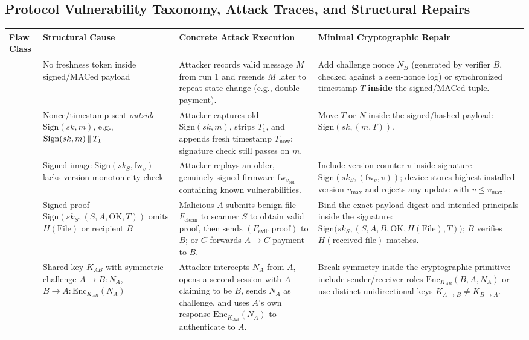 \subsection{Protocol Vulnerability Taxonomy, Attack Traces, and Structural Repairs}

\begin{table}[h!]
\centering
\footnotesize
\begin{tabularx}{\textwidth}{@{}L{2.6cm} L{3.8cm} Y Y@{}}
\toprule
\textbf{Flaw Class} & \textbf{Structural Cause} & \textbf{Concrete Attack Execution} & \textbf{Minimal Cryptographic Repair} \\
\midrule
{} & No freshness token inside signed/MACed payload & Attacker records valid message $M$ from run 1 and resends $M$ later to repeat state change (e.g., double payment). & Add challenge nonce $N_B$ (generated by verifier $B$, checked against a seen-nonce log) or synchronized timestamp $T$ \textbf{inside} the signed/MACed tuple. \\
 & Nonce/timestamp sent \emph{outside} $\mathrm{Sign}(sk, m)$, e.g., $\mathrm{Sign}(sk, m) \,\|\, T_1$ & Attacker captures old $\mathrm{Sign}(sk, m)$, strips $T_1$, and appends fresh timestamp $T_{\text{now}}$; signature check still passes on $m$. & Move $T$ or $N$ inside the signed/hashed payload: $\mathrm{Sign}(sk, (m, T))$. \\
 & Signed image $\mathrm{Sign}(sk_S, \text{fw}_v)$ lacks version monotonicity check & Attacker replays an older, genuinely signed firmware $\text{fw}_{v_{\text{old}}}$ containing known vulnerabilities. & Include version counter $v$ inside signature $\mathrm{Sign}(sk_S, (\text{fw}_v, v))$; device stores highest installed version $v_{\max}$ and rejects any update with $v \le v_{\max}$. \\
 & Signed proof $\mathrm{Sign}(sk_S, (S, A, \text{OK}, T))$ omits $H(\text{File})$ or recipient $B$ & Malicious $A$ submits benign file $F_{\text{clean}}$ to scanner $S$ to obtain valid proof, then sends $(F_{\text{evil}}, \text{proof})$ to $B$; or $C$ forwards $A\to C$ payment to $B$. & Bind the exact payload digest and intended principals inside the signature: $\mathrm{Sign}\big(sk_S, (S, A, B, \text{OK}, H(\text{File}), T)\big)$; $B$ verifies $H(\text{received file})$ matches. \\
 & Shared key $K_{AB}$ with symmetric challenge $A \to B : N_A$, $B \to A : \mathrm{Enc}_{K_{AB}}(N_A)$ & Attacker intercepts $N_A$ from $A$, opens a second session with $A$ claiming to be $B$, sends $N_A$ as challenge, and uses $A$'s own response $\mathrm{Enc}_{K_{AB}}(N_A)$ to authenticate to $A$. & Break symmetry inside the cryptographic primitive: include sender/receiver roles $\mathrm{Enc}_{K_{AB}}(B, A, N_A)$ or use distinct unidirectional keys $K_{A\to B} \neq K_{B\to A}$. \\

\end{tabularx}
\end{table}
